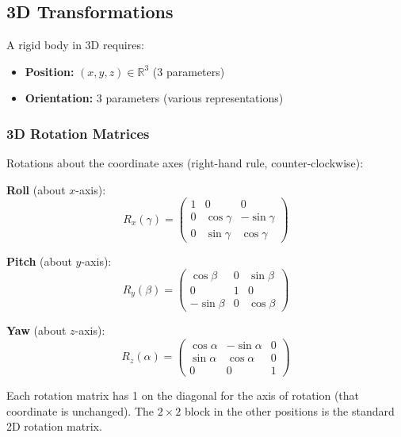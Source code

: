 \bigseparator

\subsection{3D Transformations}

A rigid body in 3D requires:
\begin{itemize}
  \item \textbf{Position:} $(x, y, z) \in \mathbb{R}^3$ (3 parameters)
  \item \textbf{Orientation:} 3 parameters (various representations)
\end{itemize}

\subsubsection{3D Rotation Matrices}

\begin{defbox}
Rotations about the coordinate axes (right-hand rule, counter-clockwise):

\textbf{Roll} (about $x$-axis):
\[
R_x(\gamma) = \begin{pmatrix} 1 & 0 & 0 \\ 0 & \cos\gamma & -\sin\gamma \\ 0 & \sin\gamma & \cos\gamma \end{pmatrix}
\]

\textbf{Pitch} (about $y$-axis):
\[
R_y(\beta) = \begin{pmatrix} \cos\beta & 0 & \sin\beta \\ 0 & 1 & 0 \\ -\sin\beta & 0 & \cos\beta \end{pmatrix}
\]

\textbf{Yaw} (about $z$-axis):
\[
R_z(\alpha) = \begin{pmatrix} \cos\alpha & -\sin\alpha & 0 \\ \sin\alpha & \cos\alpha & 0 \\ 0 & 0 & 1 \end{pmatrix}
\]
\end{defbox}

\begin{tipbox}
Each rotation matrix has 1 on the diagonal for the axis of rotation (that coordinate is unchanged). The $2\times 2$ block in the other positions is the standard 2D rotation matrix.
\end{tipbox}

